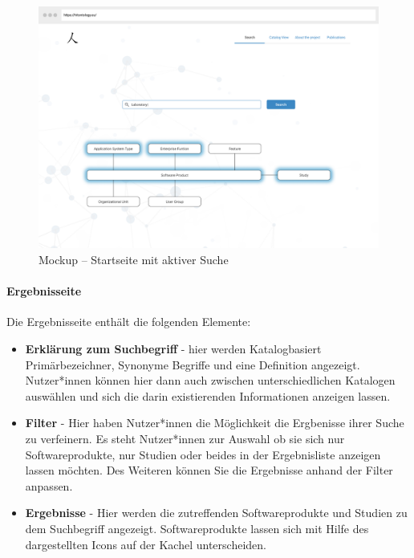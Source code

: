 \begin{figure}[H]
	\centering
    	\includegraphics[width=1.45\textwidth, angle=-90]{Images/Mockup_Startseite_2}
   	\caption[Mockup -- Startseite mit aktiver Suche]{Mockup -- Startseite mit aktiver Suche}
   	\label{fig:mockup_start2}
\end{figure}

\clearpage

\paragraph{Ergebnisseite}

Die Ergebnisseite enthält die folgenden Elemente:

\begin{itemize}
\item \textbf{Erklärung zum Suchbegriff} - hier werden Katalogbasiert Primärbezeichner, Synonyme Begriffe und eine Definition angezeigt. Nutzer*innen können hier dann auch zwischen unterschiedlichen Katalogen auswählen und sich die darin existierenden Informationen anzeigen lassen.
\item \textbf {Filter} - Hier haben Nutzer*innen die Möglichkeit die Ergbenisse ihrer Suche zu verfeinern. Es steht Nutzer*innen zur Auswahl ob sie sich nur Softwareprodukte, nur Studien oder beides in der Ergebnisliste anzeigen lassen möchten. Des Weiteren können Sie die Ergebnisse anhand der Filter anpassen.
\item \textbf{Ergebnisse} - Hier werden die zutreffenden Softwareprodukte und Studien zu dem Suchbegriff angezeigt. Softwareprodukte lassen sich mit Hilfe des dargestellten Icons auf der Kachel unterscheiden.
\end{itemize}

